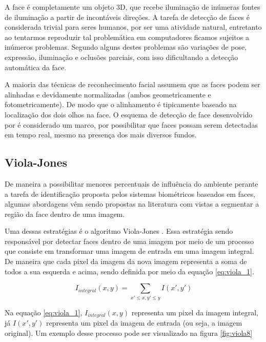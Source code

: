 A face é completamente um objeto 3D, que recebe iluminação de inúmeras fontes de iluminação a partir de incontáveis direções. A tarefa de detecção de faces é considerada trivial para seres humanos, por ser uma atividade natural, entretanto ao tentarmos reproduzir tal problemática em computadores ficamos sujeitos a inúmeros problemas.  Segundo  alguns destes problemas são variações de pose, expressão, iluminação e oclusões parciais, com isso dificultando a detecção automática da face. 

A maioria das técnicas de reconhecimento facial assumem que as faces podem ser alinhadas e devidamente normalizadas (ambos geometricamente e fotometricamente). De modo que o alinhamento é tipicamente baseado na localização dos dois olhos na face. O esquema de detecção de face desenvolvido por \cite{viola2004robust} é considerado um marco, por possibilitar que faces possam serem detectadas em tempo real, mesmo na presença dos mais diversos fundos.  


\subsection{Viola-Jones}


De maneira a possibilitar menores percentuais de influência do ambiente perante a tarefa de identificação proposta pelos sistemas biométricos baseados em faces, algumas abordagens vêm sendo propostas na literatura com vistas a segmentar a região da face dentro de uma imagem. 

Uma dessas estratégias é o algoritmo Viola-Jones \cite{viola2004robust}. Essa estratégia sendo responsável por detectar faces dentro de uma imagem por meio de um processo que consiste em transformar uma imagem de entrada em uma imagem integral. De maneira que cada pixel da imagem da nova imagem representa a soma de todos a sua esquerda e acima, sendo definida por meio da equação \ref{eq:viola_1}.

\begin{equation}
\label{eq:viola_1}
I_{integral}(x,y) = \sum_{x'\leq x,y' \leq y} I(x',y') 
\end{equation}


Na equação \ref{eq:viola_1}, $I_{integral}(x,y)$ representa um pixel da imagem integral, já $I(x',y')$ representa um pixel da imagem de entrada (ou seja, a imagem original). Um exemplo desse processo pode ser visualizado na figura \ref{fig:viola8}

